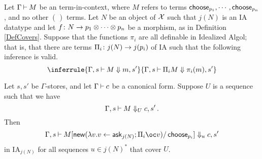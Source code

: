 \begin{lemma}
  Let $\Gamma \ts M$ be an \IAXX term-in-context, where $M$ refers to terms $\choose_{p_1},\cdots,\choose_{p_n}$, and no other $\choose$ terms.
  Let $N$ be an object of $\X$ such that $j(N)$ is an IA datatype and let $f\from N \to p_1\tensor \cdots \tensor p_n$ be a morphism, as in Definition \ref{DefCovers}.  
  Suppose that the functions $\pi_i$ are all definable in Idealized Algol; that is, that there are terms $\Pi_i\from j(N) \to j(p_i)$ of IA such that the following inference is valid.
  \[
    \inferrule{ \Gamma,s\ts M \converges m,s'}{\Gamma,s\ts \Pi_i M\converges \pi_i(m),s'}
    \]

  Let $s,s'$ be $\Gamma$-stores, and let $\Gamma\ts c$ be a canonical form.  
  Suppose $U$ is a sequence such that we have
  \[
    \Gamma,s\ts M\converges_U c,s'\,.
    \]
  Then
  \[
    \Gamma,s\ts M[\neww (\lambda v.v\gets \ask_{j(N)};\Pi_i \oc v)/\choose_{p_i}] \converges_u c,s'
    \]
  in IA${}_{j(N)}$ for all sequences $u\in j(N)^*$ that cover $U$.
  \label{LemSoundnessIaxx}
\end{lemma}

